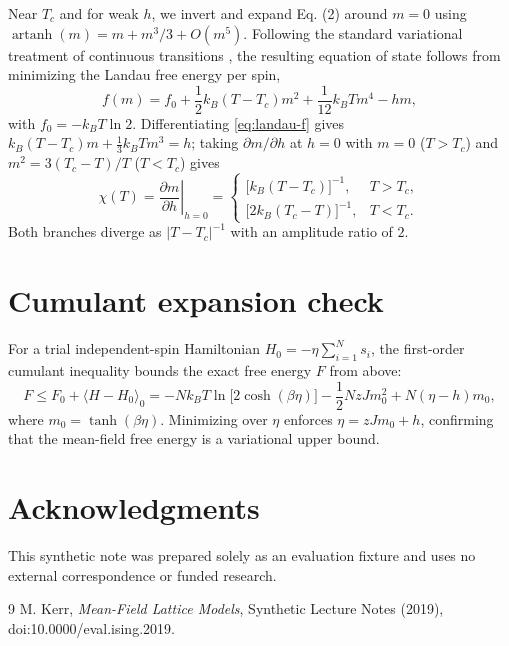 \documentclass{article}
\begin{document}
Near $T_c$ and for weak $h$, we invert and expand Eq. (2) around $m = 0$ using
$\operatorname{artanh}(m) = m + m^3/3 + O(m^5)$. Following the standard variational
treatment of continuous transitions \cite[Section~3.1]{kerr2019ising}, the resulting
equation of state follows from minimizing the Landau free energy per spin,
\begin{equation}\label{eq:landau-f}
  f(m) = f_0 + \frac{1}{2} k_B (T - T_c) m^2 + \frac{1}{12} k_B T m^4 - h m,
\end{equation}
with $f_0 = -k_B T \ln 2$. Differentiating \eqref{eq:landau-f} gives
$k_B(T - T_c) m + \frac{1}{3} k_B T m^3 = h$; taking $\partial m / \partial h$ at
$h = 0$ with $m = 0$ ($T > T_c$) and $m^2 = 3(T_c - T)/T$ ($T < T_c$) gives
\begin{equation}\label{eq:chi}
  \chi(T) = \left.\frac{\partial m}{\partial h}\right|_{h=0} =
  \begin{cases}
    \bigl[k_B (T - T_c)\bigr]^{-1}, & T > T_c, \\
    \bigl[2 k_B (T_c - T)\bigr]^{-1}, & T < T_c.
  \end{cases}
\end{equation}
Both branches diverge as $|T - T_c|^{-1}$ with an amplitude ratio of $2$.

\appendix

\section{Cumulant expansion check}\label{sec:app-cumulant}

For a trial independent-spin Hamiltonian $H_0 = -\eta \sum_{i=1}^{N} s_i$, the
first-order cumulant inequality bounds the exact free energy $F$ from above:
\[
  F \leq F_0 + \langle H - H_0 \rangle_0
  = -N k_B T \ln\bigl[2\cosh(\beta \eta)\bigr]
    - \frac{1}{2} N z J m_0^2 + N(\eta - h) m_0,
\]
where $m_0 = \tanh(\beta \eta)$. Minimizing over $\eta$ enforces $\eta = z J m_0 + h$,
confirming that the mean-field free energy is a variational upper bound.

\section*{Acknowledgments}

This synthetic note was prepared solely as an evaluation fixture and uses no
external correspondence or funded research.

\begin{thebibliography}{9}
 M. Kerr, \emph{Mean-Field Lattice Models}, Synthetic Lecture Notes (2019), doi:10.0000/eval.ising.2019.
\end{thebibliography}
\end{document}
